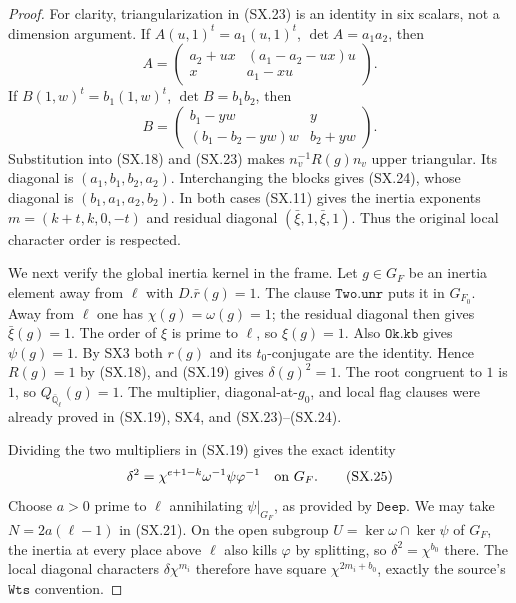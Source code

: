 \begin{proof}
For clarity, triangularization in (SX.23) is an identity in six
scalars, not a dimension argument.  If $A(u,1)^t=a_1(u,1)^t$,
$\det A=a_1a_2$, then
\[
 A=\begin{pmatrix}
 a_2+ux&(a_1-a_2-ux)u\\x&a_1-xu
 \end{pmatrix}.
\]
If $B(1,w)^t=b_1(1,w)^t$, $\det B=b_1b_2$, then
\[
 B=\begin{pmatrix}
 b_1-yw&y\\(b_1-b_2-yw)w&b_2+yw
 \end{pmatrix}.
\]
Substitution into (SX.18) and (SX.23) makes
$n_v^{-1}R(g)n_v$ upper triangular.  Its diagonal is
$(a_1,b_1,b_2,a_2)$.
Interchanging the blocks gives (SX.24), whose diagonal is
$(b_1,a_1,a_2,b_2)$.
In both cases (SX.11) gives the inertia exponents
$m=(k+t,k,0,-t)$ and residual diagonal
$(\bar\xi,1,\bar\xi,1)$.
Thus the original local character order is respected.

We next verify the global inertia kernel in the frame.
Let $g\in G_F$ be an inertia element away from $\ell$ with
$D.\bar r(g)=1$.  The clause $\texttt{Two.unr}$ puts it in
$G_{F_0}$.  Away from $\ell$ one has $\chi(g)=\omega(g)=1$;
the residual diagonal then gives $\bar\xi(g)=1$.
The order of $\xi$ is prime to $\ell$, so $\xi(g)=1$.
Also $\texttt{Ok.kb}$ gives $\psi(g)=1$.
By SX3 both $r(g)$ and its $t_0$-conjugate are the identity.
Hence $R(g)=1$ by (SX.18), and (SX.19) gives $\delta(g)^2=1$.
The root congruent to $1$ is $1$, so $Q_{\bar{\mathbb Q}_\ell}(g)=1$.
The multiplier, diagonal-at-$g_0$, and local flag clauses were
already proved in (SX.19), SX4, and (SX.23)--(SX.24).

Dividing the two multipliers in (SX.19) gives the exact identity
\[
       \delta^2=\chi^{e+1-k}\omega^{-1}\psi\varphi^{-1}
                                  \quad\hbox{on }G_F.       \tag{SX.25}
\]
Choose $a>0$ prime to $\ell$ annihilating $\psi|_{G_F}$, as
provided by $\texttt{Deep}$.  We may take
$N=2a(\ell-1)$ in (SX.21).
On the open subgroup $U=\ker\omega\cap\ker\psi$ of $G_F$,
the inertia at every place above $\ell$ also kills $\varphi$
by splitting, so $\delta^2=\chi^{b_0}$ there.
The local diagonal characters $\delta\chi^{m_i}$ therefore
have square $\chi^{2m_i+b_0}$, exactly the source's
$\texttt{Wts}$ convention.


\end{proof}
